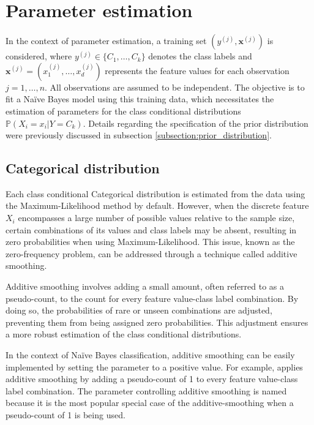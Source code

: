 \documentclass{article}\usepackage[]{graphicx}\usepackage[]{xcolor}
\begin{document}
\begin{itemize}
\end{itemize}

\section{Parameter estimation}

In the context of parameter estimation, a training set $(y^{(j)}, \boldsymbol{x}^{(j)})$ is considered, where $y^{(j)} \in \{C_1,\ldots,C_k\}$ denotes the class labels and $\boldsymbol{x}^{(j)} = (x^{(j)}_1,\ldots,x^{(j)}_d)$ represents the feature values for each observation $j=1,\ldots, n$. All observations are assumed to be independent. The objective is to fit a Na\"ive Bayes model using this training data, which necessitates the estimation of parameters for the class conditional distributions $\mathbb{P}(X_i = x_i | Y = C_k)$. Details regarding the specification of the prior distribution were previously discussed in subsection \ref{subsection:prior_distribution}.

\subsection{Categorical distribution}
\label{subsec:cat}

Each class conditional Categorical distribution is estimated from the data using the Maximum-Likelihood method by default. However, when the discrete feature $X_i$ encompasses a large number of possible values relative to the sample size, certain combinations of its values and class labels may be absent, resulting in zero probabilities when using Maximum-Likelihood. This issue, known as the zero-frequency problem, can be addressed through a technique called additive smoothing.

Additive smoothing involves adding a small amount, often referred to as a pseudo-count, to the count for every feature value-class label combination. By doing so, the probabilities of rare or unseen combinations are adjusted, preventing them from being assigned zero probabilities. This adjustment ensures a more robust estimation of the class conditional distributions.

In the context of Na\"ive Bayes classification, additive smoothing can be easily implemented by setting the parameter \textcolor{darkgreen}{{}} to a positive value. For example, \textcolor{darkgreen}{{}} applies additive smoothing by adding a pseudo-count of 1 to every feature value-class label combination. The parameter controlling additive smoothing is named \textcolor{darkgreen}{{}} because it is the most popular special case of the additive-smoothing when a pseudo-count of 1 is being used.
\end{document}
